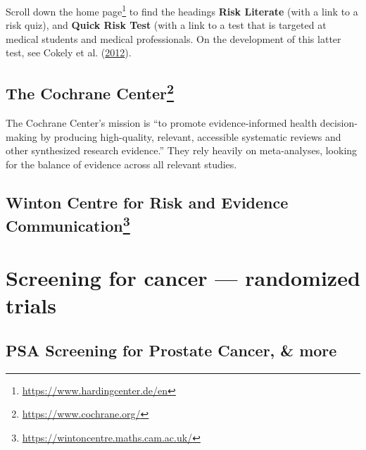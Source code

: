 \documentclass[
  10pt,
  b5paper]{book}
\begin{document}
Scroll down the home page\footnote{\url{https://www.hardingcenter.de/en}} to find the headings \textbf{Risk
Literate} (with a link to a risk quiz), and \textbf{Quick Risk Test} (with a
link to a test that is targeted at medical students and medical
professionals. On the development of this latter test, see
Cokely et al. (\protect\hyperlink{ref-cokely2012measuring}{2012}).

\hypertarget{the-cochrane-center04-medical-4}{%
\subsection*{\texorpdfstring{The Cochrane Center\footnote{\url{https://www.cochrane.org/}}}{The Cochrane Center}}\label{the-cochrane-center04-medical-4}}

The Cochrane Center's mission is ``to promote evidence-informed health
decision-making by producing high-quality, relevant, accessible
systematic reviews and other synthesized research evidence.'' They rely
heavily on meta-analyses, looking for the balance of evidence across all
relevant studies.

\hypertarget{winton-centre-for-risk-and-evidence-communication04-medical-5}{%
\subsection*{\texorpdfstring{Winton Centre for Risk and Evidence Communication\footnote{\url{https://wintoncentre.maths.cam.ac.uk/}}}{Winton Centre for Risk and Evidence Communication}}\label{winton-centre-for-risk-and-evidence-communication04-medical-5}}

\hypertarget{screening-for-cancer-randomized-trials}{%
\section{Screening for cancer --- randomized trials}\label{screening-for-cancer-randomized-trials}}

\hypertarget{psa-screening-for-prostate-cancer-more}{%
\subsection*{PSA Screening for Prostate Cancer, \& more}\label{psa-screening-for-prostate-cancer-more}}
\end{document}
